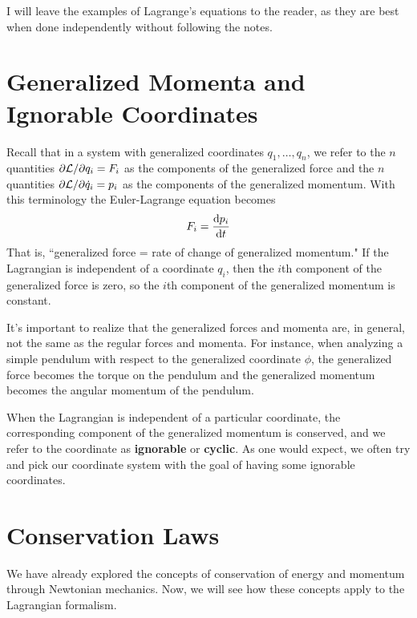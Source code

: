 I will leave the examples of Lagrange's equations to the reader, as they are best when done independently without following the notes.
\section{Generalized Momenta and Ignorable Coordinates}
Recall that in a system with generalized coordinates $q_1, \dots, q_n$, we refer to the $n$ quantities $\partial \mathcal{L} /\partial q_i = F_i$ as the components of the generalized force and the $n$ quantities $\partial \mathcal{L} /\partial \dot q_i = p_i$ as the components of the generalized momentum. With this terminology the Euler-Lagrange equation becomes
\[ F_i = \dv{p_i}{t} \]
That is, ``generalized force = rate of change of generalized momentum." If the Lagrangian is independent of a coordinate $q_i$, then the $i$th component of the generalized force is zero, so the $i$th component of the generalized momentum is constant. 

It's important to realize that the generalized forces and momenta are, in general, not the same as the regular forces and momenta. For instance, when analyzing a simple pendulum with respect to the generalized coordinate $\phi$, the generalized force becomes the torque on the pendulum and the generalized momentum becomes the angular momentum of the pendulum.

When the Lagrangian is independent of a particular coordinate, the corresponding component of the generalized momentum is conserved, and we refer to the coordinate as \textbf{ignorable} or \textbf{cyclic}. As one would expect, we often try and pick our coordinate system with the goal of having some ignorable coordinates. 
\section{Conservation Laws}
We have already explored the concepts of conservation of energy and momentum through Newtonian mechanics. Now, we will see how these concepts apply to the Lagrangian formalism. 
